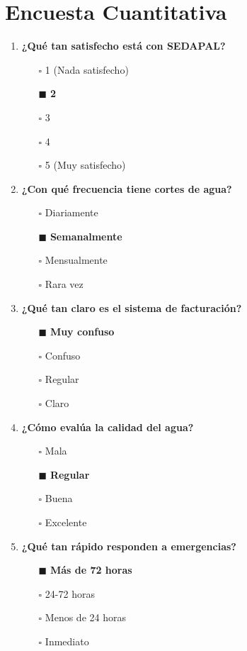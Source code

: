 \documentclass{article}
\begin{document}
\section*{Encuesta Cuantitativa}


\begin{enumerate}[leftmargin=*]
  \item \textbf{¿Qué tan satisfecho está con SEDAPAL?} 
  \begin{itemize}[label=$\square$]
      \item[$\square$] 1 (Nada satisfecho)
      \item[$\blacksquare$] \textbf{2}
      \item[$\square$] 3 
      \item[$\square$] 4 
      \item[$\square$] 5 (Muy satisfecho)
  \end{itemize}
  
  \item \textbf{¿Con qué frecuencia tiene cortes de agua?}
  \begin{itemize}[label=$\square$]
      \item[$\square$] Diariamente
      \item[$\blacksquare$] \textbf{Semanalmente}
      \item[$\square$] Mensualmente
      \item[$\square$] Rara vez
  \end{itemize}
  
  \item \textbf{¿Qué tan claro es el sistema de facturación?}
  \begin{itemize}[label=$\square$]
      \item[$\blacksquare$] \textbf{Muy confuso}
      \item[$\square$] Confuso
      \item[$\square$] Regular
      \item[$\square$] Claro
  \end{itemize}
  
  \item \textbf{¿Cómo evalúa la calidad del agua?}
  \begin{itemize}[label=$\square$]
      \item[$\square$] Mala
      \item[$\blacksquare$] \textbf{Regular}
      \item[$\square$] Buena
      \item[$\square$] Excelente
  \end{itemize}
  
  \item \textbf{¿Qué tan rápido responden a emergencias?}
  \begin{itemize}[label=$\square$]
      \item[$\blacksquare$] \textbf{Más de 72 horas}
      \item[$\square$] 24-72 horas
      \item[$\square$] Menos de 24 horas
      \item[$\square$] Inmediato
  \end{itemize}
\end{enumerate}
\end{document}
